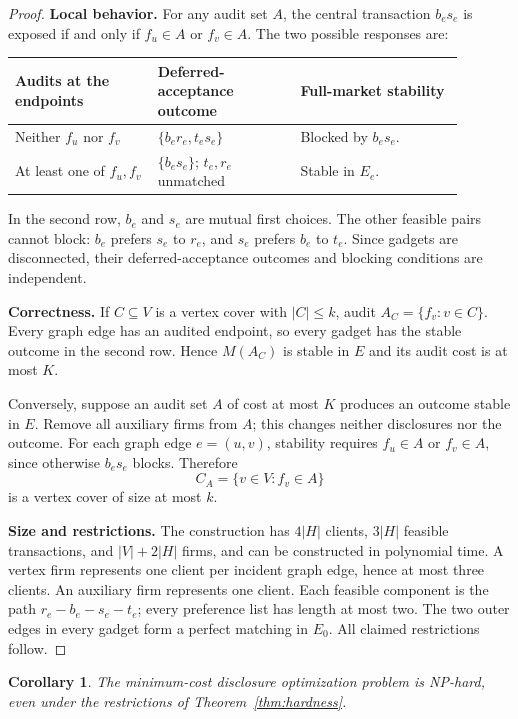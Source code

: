 \documentclass[11pt,letterpaper]{article}
\newtheorem{corollary}[theorem]{Corollary}
\theoremstyle{definition}
\theoremstyle{remark}
\begin{document}
\begin{proof}
\medskip
\noindent\textbf{Local behavior.}
For any audit set \(A\), the central transaction \(b_es_e\) is exposed if and
only if \(f_u\in A\) or \(f_v\in A\). The two possible responses are:
\begin{center}
\begin{tabular}{@{}p{0.28\linewidth}p{0.29\linewidth}p{0.32\linewidth}@{}}
\toprule
Audits at the endpoints & Deferred-acceptance outcome & Full-market stability\\
\midrule
Neither \(f_u\) nor \(f_v\)
&
\(\{b_er_e,t_es_e\}\)
&
Blocked by \(b_es_e\).
\\[5pt]
At least one of \(f_u,f_v\)
&
\(\{b_es_e\}\); \(t_e,r_e\) unmatched
&
Stable in \(E_e\).
\\
\bottomrule
\end{tabular}
\end{center}
In the second row, \(b_e\) and \(s_e\) are mutual first choices. The other
feasible pairs cannot block: \(b_e\) prefers \(s_e\) to \(r_e\), and \(s_e\)
prefers \(b_e\) to \(t_e\). Since gadgets are disconnected, their
deferred-acceptance outcomes and blocking conditions are independent.

\medskip
\noindent\textbf{Correctness.}
If \(C\subseteq V\) is a vertex cover with \(|C|\leq k\), audit
\(A_C=\{f_v:v\in C\}\). Every graph edge has an audited endpoint, so every gadget
has the stable outcome in the second row. Hence \(M(A_C)\) is stable in \(E\)
and its audit cost is at most \(K\).

Conversely, suppose an audit set \(A\) of cost at most \(K\) produces an outcome
stable in \(E\). Remove all auxiliary firms from \(A\); this changes neither
disclosures nor the outcome. For each graph edge \(e=(u,v)\), stability requires
\(f_u\in A\) or \(f_v\in A\), since otherwise \(b_es_e\) blocks.
Therefore
\[
C_A=\{v\in V:f_v\in A\}
\]
is a vertex cover of size at most \(k\).

\medskip
\noindent\textbf{Size and restrictions.}
The construction has \(4|H|\) clients, \(3|H|\) feasible transactions, and
\(|V|+2|H|\) firms, and can be constructed in polynomial time. A vertex firm
represents one client per incident graph edge, hence at most three clients.
An auxiliary firm represents one client. Each feasible component is the path
\(r_e-b_e-s_e-t_e\); every preference list has length at most two.
The two outer edges in every gadget form a perfect matching in \(E_0\).
All claimed restrictions follow.
\end{proof}

\begin{corollary}
The minimum-cost disclosure optimization problem is NP-hard, even under the
restrictions of Theorem~\ref{thm:hardness}.
\end{corollary}
\end{document}
